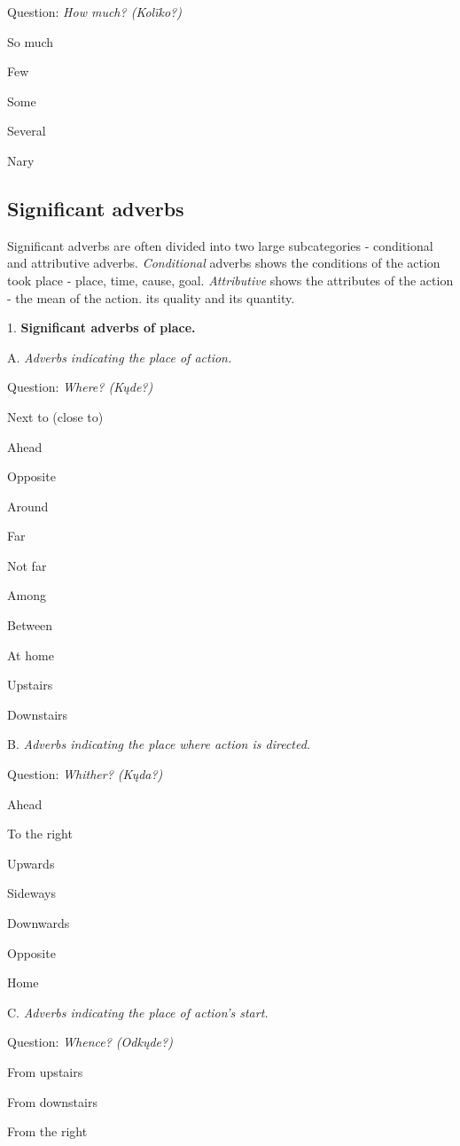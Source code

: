 Question: \textit{How much? (Kolïko?)}

So much

Few

Some

Several

Nary


\subsection{Significant adverbs}

Significant adverbs are often divided into two large subcategories - conditional and attributive adverbs. \textit{Conditional} adverbs shows the conditions of the action took place - place, time, cause, goal. \textit{Attributive} shows the attributes of the action - the mean of the action. its quality and its quantity.

1. \textbf{Significant adverbs of place.}

A. \textit{Adverbs indicating the place of action.}

Question: \textit{Where? (Kųde?)}

Next to (close to)

Ahead

Opposite

Around

Far

Not far

Among

Between

At home

Upstairs

Downstairs


B. \textit{Adverbs indicating the place where action is directed. }

Question:\textit{ Whither? (Kųda?)}

Ahead

To the right

Upwards

Sideways

Downwards

Opposite

Home


C. \textit{Adverbs indicating the place of action’s start.}

Question: \textit{Whence? (Odkųde?)}

From upstairs

From downstairs

From the right

